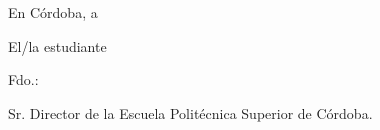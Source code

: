 \vspace{0.9cm}

\noindent En Córdoba, a \FechaDeclaracion

\vspace{1.0cm}

\begin{center}
\noindent El/la estudiante
\end{center}

\vspace{2cm}

\begin{center}   
\noindent Fdo.: \AutorTFG%

\vfill
Sr. Director de la Escuela Politécnica Superior de Córdoba.

\end{center}

\restoregeometry

\endinput
